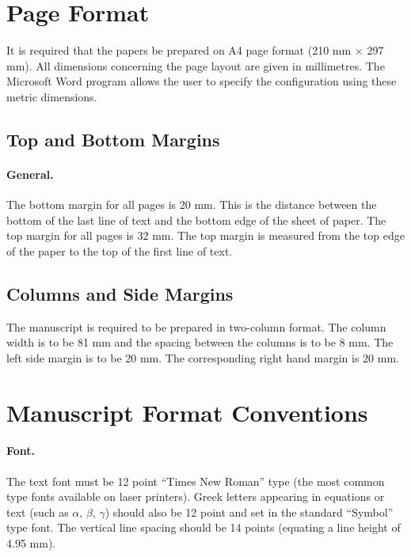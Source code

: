 \documentclass[bibtex,pagenumbers]{stabs2021}
\begin{document}
\section{Page Format}

It is required that the papers be prepared on A4 page format (210 mm
\(\times\) 297 mm). All dimensions concerning the page layout are
given in millimetres. The Microsoft Word program allows the user to
specify the configuration using these metric dimensions.

\subsection{Top and Bottom Margins}

\paragraph{General.}

The bottom margin for all pages is 20 mm. This is the distance between
the bottom of the last line of text and the bottom edge of the sheet
of paper. The top margin for all pages is 32 mm. The top margin is
measured from the top edge of the paper to the top of the first line
of text.

\subsection{Columns and Side Margins}

The manuscript is required to be prepared in two-column format. The
column width is to be 81 mm and the spacing between the columns is to
be 8 mm. The left side margin is to be 20 mm. The corresponding right
hand margin is 20 mm.

\section{Manuscript Format Conventions}

\paragraph{Font.}

The text font must be 12 point ``Times New Roman'' type (the most
common type fonts available on laser printers). Greek letters
appearing in equations or text (such as \(\alpha\), \(\beta\),
\(\gamma\)) should also be 12 point and set in the standard ``Symbol''
type font. The vertical line spacing should be 14 points (equating a
line height of 4.95 mm).
\end{document}
